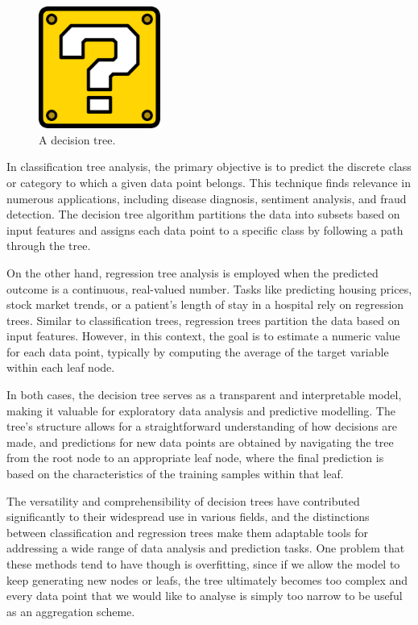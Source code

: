 \begin{figure}[h]
	\includegraphics[width=4cm]{Figures/missing.png}
	\centering
	\caption{A decision tree.}
	\label{building_BASS}
\end{figure}

In classification tree analysis, the primary objective is to predict the discrete class or category to which a given data point belongs. This technique finds relevance in numerous applications, including disease diagnosis, sentiment analysis, and fraud detection. The decision tree algorithm partitions the data into subsets based on input features and assigns each data point to a specific class by following a path through the tree.

On the other hand, regression tree analysis is employed when the predicted outcome is a continuous, real-valued number. Tasks like predicting housing prices, stock market trends, or a patient's length of stay in a hospital rely on regression trees. Similar to classification trees, regression trees partition the data based on input features. However, in this context, the goal is to estimate a numeric value for each data point, typically by computing the average of the target variable within each leaf node.

In both cases, the decision tree serves as a transparent and interpretable model, making it valuable for exploratory data analysis and predictive modelling. The tree's structure allows for a straightforward understanding of how decisions are made, and predictions for new data points are obtained by navigating the tree from the root node to an appropriate leaf node, where the final prediction is based on the characteristics of the training samples within that leaf.

The versatility and comprehensibility of decision trees have contributed significantly to their widespread use in various fields, and the distinctions between classification and regression trees make them adaptable tools for addressing a wide range of data analysis and prediction tasks. One problem that these methods tend to have though is overfitting, since if we allow the model to keep generating new nodes or leafs, the tree ultimately becomes too complex and every data point that we would like to analyse is simply too narrow to be useful as an aggregation scheme. 

